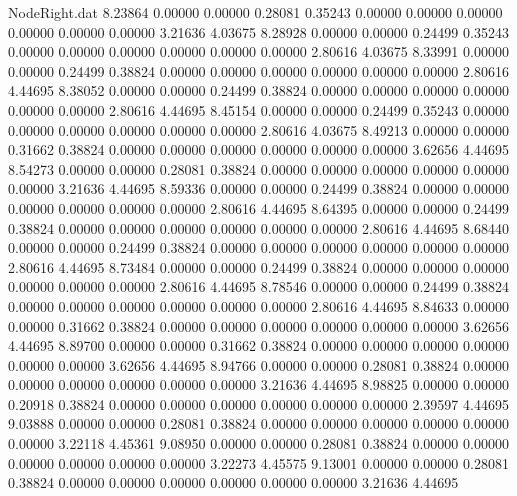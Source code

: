 \begin{filecontents}{NodeRight.dat}
   8.23864    0.00000    0.00000     0.28081    0.35243    0.00000    0.00000    0.00000    0.00000    0.00000    0.00000    3.21636    4.03675
   8.28928    0.00000    0.00000     0.24499    0.35243    0.00000    0.00000    0.00000    0.00000    0.00000    0.00000    2.80616    4.03675
   8.33991    0.00000    0.00000     0.24499    0.38824    0.00000    0.00000    0.00000    0.00000    0.00000    0.00000    2.80616    4.44695
   8.38052    0.00000    0.00000     0.24499    0.38824    0.00000    0.00000    0.00000    0.00000    0.00000    0.00000    2.80616    4.44695
   8.45154    0.00000    0.00000     0.24499    0.35243    0.00000    0.00000    0.00000    0.00000    0.00000    0.00000    2.80616    4.03675
   8.49213    0.00000    0.00000     0.31662    0.38824    0.00000    0.00000    0.00000    0.00000    0.00000    0.00000    3.62656    4.44695
   8.54273    0.00000    0.00000     0.28081    0.38824    0.00000    0.00000    0.00000    0.00000    0.00000    0.00000    3.21636    4.44695
   8.59336    0.00000    0.00000     0.24499    0.38824    0.00000    0.00000    0.00000    0.00000    0.00000    0.00000    2.80616    4.44695
   8.64395    0.00000    0.00000     0.24499    0.38824    0.00000    0.00000    0.00000    0.00000    0.00000    0.00000    2.80616    4.44695
   8.68440    0.00000    0.00000     0.24499    0.38824    0.00000    0.00000    0.00000    0.00000    0.00000    0.00000    2.80616    4.44695
   8.73484    0.00000    0.00000     0.24499    0.38824    0.00000    0.00000    0.00000    0.00000    0.00000    0.00000    2.80616    4.44695
   8.78546    0.00000    0.00000     0.24499    0.38824    0.00000    0.00000    0.00000    0.00000    0.00000    0.00000    2.80616    4.44695
   8.84633    0.00000    0.00000     0.31662    0.38824    0.00000    0.00000    0.00000    0.00000    0.00000    0.00000    3.62656    4.44695
   8.89700    0.00000    0.00000     0.31662    0.38824    0.00000    0.00000    0.00000    0.00000    0.00000    0.00000    3.62656    4.44695
   8.94766    0.00000    0.00000     0.28081    0.38824    0.00000    0.00000    0.00000    0.00000    0.00000    0.00000    3.21636    4.44695
   8.98825    0.00000    0.00000     0.20918    0.38824    0.00000    0.00000    0.00000    0.00000    0.00000    0.00000    2.39597    4.44695
   9.03888    0.00000    0.00000     0.28081    0.38824    0.00000    0.00000    0.00000    0.00000    0.00000    0.00000    3.22118    4.45361
   9.08950    0.00000    0.00000     0.28081    0.38824    0.00000    0.00000    0.00000    0.00000    0.00000    0.00000    3.22273    4.45575
   9.13001    0.00000    0.00000     0.28081    0.38824    0.00000    0.00000    0.00000    0.00000    0.00000    0.00000    3.21636    4.44695

\end{filecontents}
